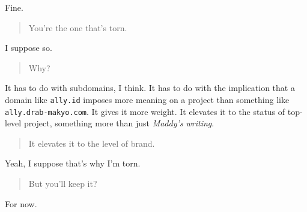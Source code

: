 Fine.

\begin{quote}
You're the one that's torn.
\end{quote}

I suppose so.

\begin{quote}
Why?
\end{quote}

It has to do with subdomains, I think. It has to do with the implication that a domain like \texttt{ally.id} imposes more meaning on a project than something like \texttt{ally.drab-makyo.com}. It gives it more weight. It elevates it to the status of top-level project, something more than just \emph{Maddy's writing}.

\begin{quote}
It elevates it to the level of brand.
\end{quote}

Yeah, I suppose that's why I'm torn.

\begin{quote}
But you'll keep it?
\end{quote}

For now.
